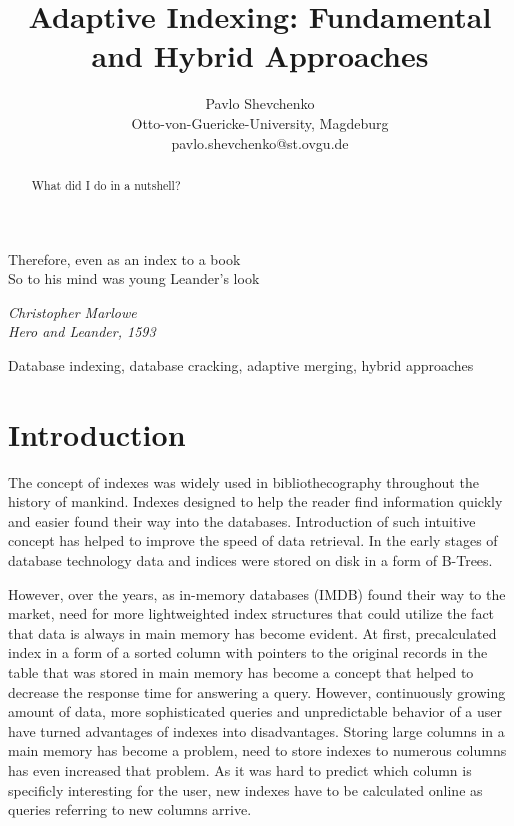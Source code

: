 \documentclass[10pt, conference, compsocconf]{IEEEtran}
\begin{document}
\title{Adaptive Indexing: Fundamental and Hybrid Approaches}
\author{Pavlo Shevchenko \\ Otto-von-Guericke-University, Magdeburg \\ pavlo.shevchenko@st.ovgu.de}

\maketitle

\epigraph{Therefore, even as an index to a book \\
So to his mind was young Leander's look}{\textit{Christopher Marlowe\\Hero and Leander, 1593}}

\begin{abstract}
What did I do in a nutshell?\\
\end{abstract}

\begin{IEEEkeywords}
Database indexing, database cracking, adaptive merging, hybrid approaches
\end{IEEEkeywords}

\section{Introduction}
The concept of indexes was widely used in bibliothecography throughout the history of mankind. %
Indexes designed to help the reader find information quickly and easier found their way into the databases. Introduction of such intuitive concept has helped to improve the speed of data retrieval. In the early stages of database technology data and indices were stored on disk in a form of B-Trees.

However, over the years, as in-memory databases (IMDB) found their way to the market, need for more lightweighted index structures that could utilize the fact that data is always in main memory has become evident. At first, precalculated index in a form of a sorted column with pointers to the original records in the table that was stored in main memory has become a concept that helped to decrease the response time for answering a query. However, continuously growing amount of data, more sophisticated queries and unpredictable behavior of a user have turned advantages of indexes into disadvantages. Storing large columns in a main memory has become a problem, need to store indexes to numerous columns has even increased that problem. As it was hard to predict which column is specificly interesting for the user, new indexes have to be calculated online as queries referring to new columns arrive.
\end{document}
